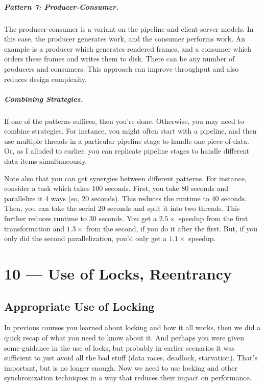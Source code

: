 \documentclass[a4paper]{report}
\begin{document}
\paragraph{Pattern 7: Producer-Consumer.} The producer-consumer is 
a variant on the pipeline and client-server models. In this case, the
producer generates work, and the consumer performs work. An example is
a producer which generates rendered frames, and a consumer which
orders these frames and writes them to disk. There can be any number
of producers and consumers. This approach can improve throughput
and also reduces design complexity.

\paragraph{Combining Strategies.} If one of the patterns suffices,
then you're done. Otherwise, you may need to combine strategies.
For instance, you might often start with a pipeline, and then 
use multiple threads in a particular pipeline stage to handle one
piece of data. Or, as I alluded to earlier, you can replicate
pipeline stages to handle different data items simultaneously.

Note also that you can get synergies between different patterns.
For instance, consider a task which takes 100 seconds. First, you
take 80 seconds and parallelize it 4 ways (so, 20 seconds). This
reduces the runtime to 40 seconds. Then, you can take the serial 
20 seconds and split it into two threads. This further reduces 
runtime to 30 seconds. You get a $2.5\times$ speedup from the
first transformation and $1.3\times$ from the second, if you do it
after the first. But, if you only did the second parallelization,
you'd only get a $1.1\times$ speedup.










\chapter*{10 --- Use of Locks, Reentrancy}


\section*{Appropriate Use of Locking}

In previous courses you learned about locking and how it all works, then we did a quick recap of what you need to know about it. And perhaps you were given some guidance in the use of locks, but probably in earlier scenarios it was sufficient to just avoid all the bad stuff (data races, deadlock, starvation). That's important, but is no longer enough. Now we need to use locking and other synchronization techniques in a way that reduces their impact on performance.
\end{document}
